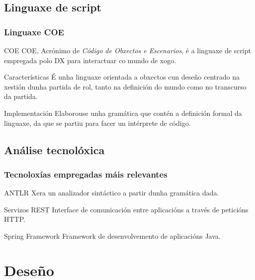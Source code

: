 \documentclass[12pt]{beamer}
\begin{document}
\subsection{Linguaxe de script} 

\begin{frame}
\frametitle{Linguaxe COE}
\begin{block}{COE}
COE, Acrónimo de \textit{Código de Obxectos e Escenarios}, é a linguaxe de
script empregada polo DX para \alert{interactuar co mundo de xogo}. 
\end{block}
\begin{block}{Características}
É unha linguaxe \alert{orientada a obxectos} cun deseño centrado na xestión
dunha partida de rol, tanto na definición do mundo como no transcurso da
partida.
\end{block}
\begin{block}{Implementación}
Elaborouse unha \alert{gramática} que contén a definición formal da linguaxe, da
que se partiu para facer un intérprete de código.
\end{block}
\end{frame}

\subsection{Análise tecnolóxica} 
\begin{frame}
\frametitle{Tecnoloxías empregadas máis relevantes}
\begin{block}{ANTLR}
Xera un analizador sintáctico a partir dunha gramática dada.
\end{block}

\begin{block}{Servizos REST}
Interface de comunicación entre aplicacións a través de peticións HTTP.
\end{block}

\begin{block}{Spring Framework}
Framework de desenvolvemento de aplicacións Java.
\end{block}
\end{frame}

\section{Deseño}
\end{document}
